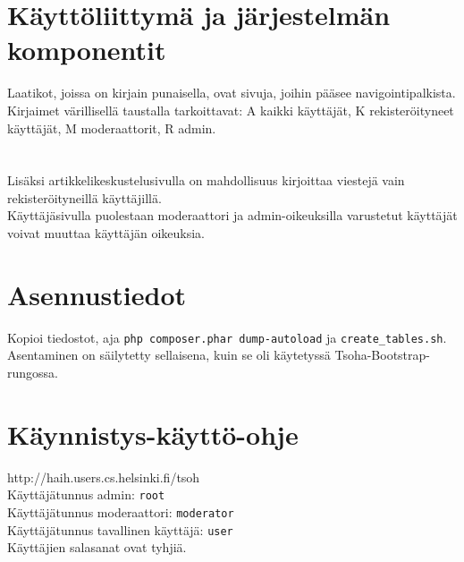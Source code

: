 \documentclass[12pt]{article}
\begin{document}
  \section{Käyttöliittymä ja järjestelmän komponentit}
        Laatikot, joissa on kirjain punaisella, ovat sivuja, joihin pääsee navigointipalkista.
        Kirjaimet värillisellä taustalla tarkoittavat: A kaikki käyttäjät, K rekisteröityneet käyttäjät, M moderaattorit, R admin. \\
         \\ \\
        Lisäksi artikkelikeskustelusivulla on mahdollisuus kirjoittaa viestejä vain rekisteröityneillä käyttäjillä.\\
        Käyttäjäsivulla puolestaan moderaattori ja admin-oikeuksilla varustetut käyttäjät voivat muuttaa käyttäjän oikeuksia. \\
   \section{Asennustiedot}
        Kopioi tiedostot, aja \texttt{php composer.phar dump-autoload} ja \texttt{create_tables.sh}. Asentaminen on säilytetty sellaisena,
        kuin se oli käytetyssä Tsoha-Bootstrap-rungossa.
   \section{Käynnistys-käyttö-ohje}
        http://haih.users.cs.helsinki.fi/tsoh \\
        Käyttäjätunnus admin: \texttt{root} \\
        Käyttäjätunnus moderaattori: \texttt{moderator} \\
        Käyttäjätunnus tavallinen käyttäjä: \texttt{user} \\ 
        Käyttäjien salasanat ovat tyhjiä.
    
\end{document}
